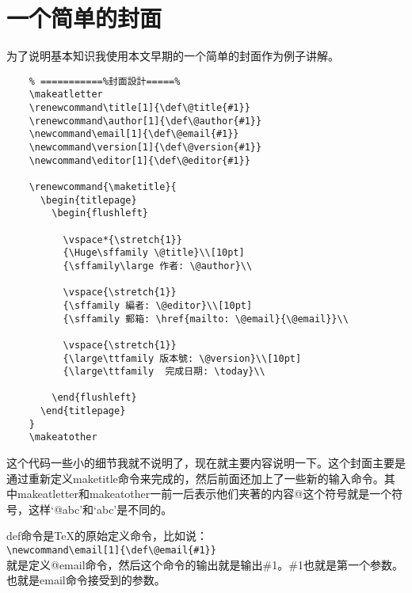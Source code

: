 \documentclass[11pt,oneside]{book}
\begin{document}
  \section{一个简单的封面}
  为了说明基本知识我使用本文早期的一个简单的封面作为例子讲解。
  \begin{Verbatim}
    % ===========%封面設計=====%
    \makeatletter
    \renewcommand\title[1]{\def\@title{#1}}
    \renewcommand\author[1]{\def\@author{#1}}
    \newcommand\email[1]{\def\@email{#1}}
    \newcommand\version[1]{\def\@version{#1}}
    \newcommand\editor[1]{\def\@editor{#1}}

    \renewcommand{\maketitle}{
      \begin{titlepage}
        \begin{flushleft}

          \vspace*{\stretch{1}}
          {\Huge\sffamily \@title}\\[10pt]
          {\sffamily\large 作者: \@author}\\

          \vspace{\stretch{1}}
          {\sffamily 編者: \@editor}\\[10pt]
          {\sffamily 郵箱: \href{mailto: \@email}{\@email}}\\

          \vspace{\stretch{1}}
          {\large\ttfamily 版本號: \@version}\\[10pt]
          {\large\ttfamily  完成日期: \today}\\

        \end{flushleft}
      \end{titlepage}
    }
    \makeatother
  \end{Verbatim}
  这个代码一些小的细节我就不说明了，现在就主要内容说明一下。这个封面主要是通过重新定义maketitle命令来完成的，然后前面还加上了一些新的输入命令。其中makeatletter和makeatother一前一后表示他们夹著的内容@这个符号就是一个符号，这样‘@abc’和‘abc’是不同的。

  def命令是\TeX 的原始定义命令，比如说：\\
  \verb+\newcommand\email[1]{\def\@email{#1}}+\\
  就是定义@email命令，然后这个命令的输出就是输出\#{}1。\#{}1也就是第一个参数。也就是email命令接受到的参数。
\end{document}
